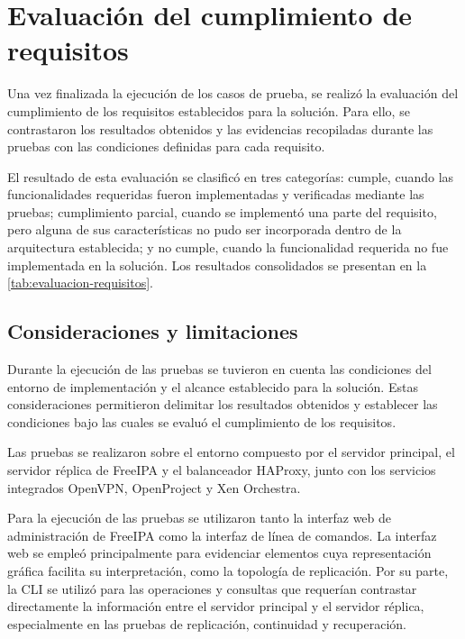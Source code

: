 \section{Evaluación del cumplimiento de requisitos}
Una vez finalizada la ejecución de los casos de prueba, se realizó la evaluación del cumplimiento de los requisitos establecidos para la solución. Para ello, se contrastaron los resultados obtenidos y las evidencias recopiladas durante las pruebas con las condiciones definidas para cada requisito.

El resultado de esta evaluación se clasificó en tres categorías: cumple, cuando las funcionalidades requeridas fueron implementadas y verificadas mediante las pruebas; cumplimiento parcial, cuando se implementó una parte del requisito, pero alguna de sus características no pudo ser incorporada dentro de la arquitectura establecida; y no cumple, cuando la funcionalidad requerida no fue implementada en la solución. Los resultados consolidados se presentan en la \autoref{tab:evaluacion-requisitos}.



\subsection{Consideraciones y limitaciones}
Durante la ejecución de las pruebas se tuvieron en cuenta las condiciones del entorno de implementación y el alcance establecido para la solución. Estas consideraciones permitieron delimitar los resultados obtenidos y establecer las condiciones bajo las cuales se evaluó el cumplimiento de los requisitos.

Las pruebas se realizaron sobre el entorno compuesto por el servidor principal, el servidor réplica de FreeIPA y el balanceador HAProxy, junto con los servicios integrados OpenVPN, OpenProject y Xen Orchestra.

Para la ejecución de las pruebas se utilizaron tanto la interfaz web de administración de FreeIPA como la interfaz de línea de comandos. La interfaz web se empleó principalmente para evidenciar elementos cuya representación gráfica facilita su interpretación, como la topología de replicación. Por su parte, la \ac{CLI} se utilizó para las operaciones y consultas que requerían contrastar directamente la información entre el servidor principal y el servidor réplica, especialmente en las pruebas de replicación, continuidad y recuperación.

